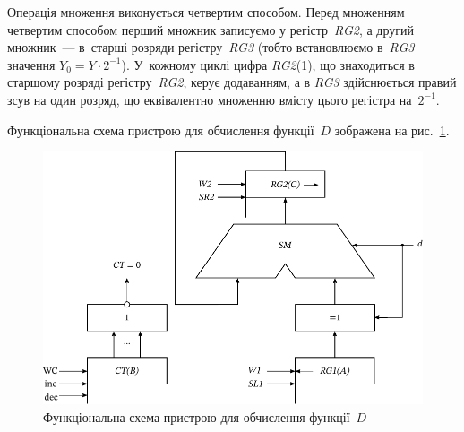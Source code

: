 \documentclass[a4paper,oneside,DIV=12,12pt]{scrartcl}
\newcommand{\schel}[1]{\textit{#1}}
\begin{document}
\begin{solution}
		Операція множення виконується четвертим способом. Перед множенням четвертим способом перший множник записуємо у регістр~\schel{RG2}, а другий множник~— в~старші розряди регістру~\schel{RG3} (тобто встановлюємо в~\schel{RG3} значення $Y_0 = Y \cdot 2^{-1}$). У~кожному циклі цифра \schel{RG2}(1), що знаходиться в старшому розряді регістру~\schel{RG2}, керує додаванням, а в \schel{RG3} здійснюється правий зсув на один розряд, що еквівалентно множенню вмісту цього регістра на~$2^{-1}$.
		
		Функціональна схема пристрою для обчислення функції~$D$ зображена на рис.~\ref{fig:task-3-function-scheme}.
		
		\begin{figure}[!htbp]
		\centering
			\includegraphics[height = 17\baselineskip]{assets/task-3-02-function-scheme.pdf}
		\caption{Функціональна схема пристрою для обчислення функції~$D$}
		\label{fig:task-3-function-scheme}
		\end{figure}
	\end{solution}
\end{document}
